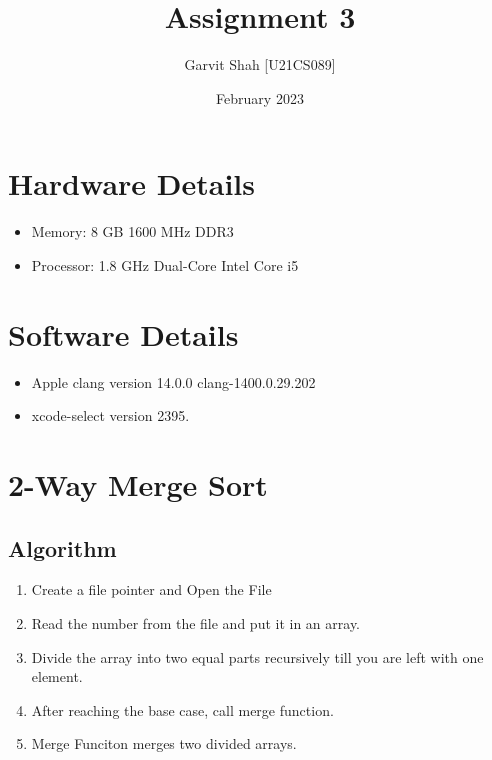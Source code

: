 \documentclass{article}
\title{Assignment 3}
\author{Garvit Shah [U21CS089]}
\date{February 2023}
\begin{document}
   \maketitle

   \section*{Hardware Details}
   \begin{itemize}
    \item Memory: 8 GB 1600 MHz DDR3
    \item Processor: 1.8 GHz Dual-Core Intel Core i5
  \end{itemize}

  \section*{Software Details}
  \begin{itemize}
   \item Apple clang version 14.0.0 clang-1400.0.29.202
   \item xcode-select version 2395.
  \end{itemize}

   \section{2-Way Merge Sort}
   \subsection{Algorithm}
   \begin{enumerate}
    \item Create a file pointer and Open the File
    \item Read the number from the file and put it in an array.
    \item Divide the array into two equal parts recursively till you are left with one element.
    \item After reaching the base case, call merge function.
    \item Merge Funciton merges two divided arrays.
   \end{enumerate}
   
\end{document}
